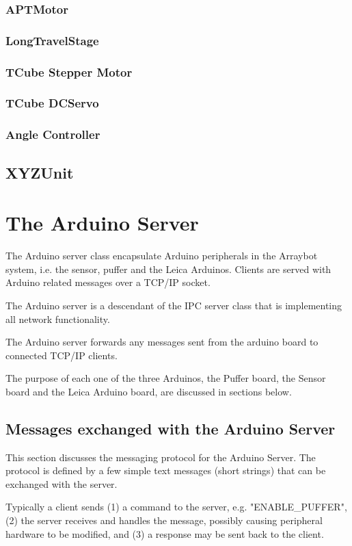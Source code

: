 \documentclass[11pt,fleqn]{book} %
\begin{document}
\subsection{APTMotor}
\subsection{LongTravelStage}
\subsection{TCube Stepper Motor}
\subsection{TCube DCServo}
\subsection{Angle Controller}
\section{XYZUnit}


\chapter{The Arduino Server}
The Arduino server class encapsulate Arduino peripherals in the Arraybot system, i.e. the sensor, puffer and the Leica Arduinos. Clients are served with Arduino related messages over a
TCP/IP socket.  

The Arduino server is a descendant of the IPC server class that is implementing all
network functionality.

The Arduino server forwards any messages sent from the arduino board to connected TCP/IP clients.

The purpose of each one of the three Arduinos, the Puffer board, the Sensor board and the Leica Arduino board, are discussed in sections below.

\section{Messages exchanged with the Arduino Server}
This section discusses the messaging protocol for the Arduino Server. The protocol is defined by a few simple text messages (short strings) that can be exchanged with the server. 

Typically a client sends (1) a command to the server, e.g. "ENABLE\_PUFFER", (2) the server receives and handles the message, possibly causing peripheral hardware to be modified, and (3) a response may be sent back to the client. 
\end{document}
